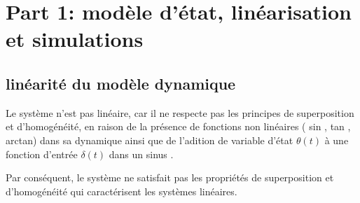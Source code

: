 \documentclass[11pt,a4paper]{article}
\begin{document}

\section{Part 1: modèle d'état, linéarisation et simulations}
\subsection{linéarité du modèle dynamique}
Le système n’est pas linéaire, car il ne respecte pas les principes de superposition et d’homogénéité, en raison de la présence de fonctions non linéaires ( sin , tan , arctan) dans sa dynamique ainsi que de l'adition de variable d'état $\theta(t)$ à une fonction d'entrée $\delta(t)$ dans un sinus .

Par conséquent, le système ne satisfait pas les propriétés de superposition et d’homogénéité qui caractérisent les systèmes linéaires.
\end{document}
